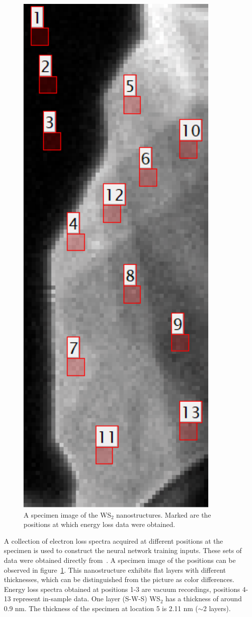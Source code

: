 \begin{figure}[h]
\begin{centering}
\includegraphics[width=0.2\linewidth]{plots/spectrumpositions.pdf} 
\caption{A specimen image of the WS$_2$ nanostructures. 
Marked are the positions at which energy loss data were obtained.}
\label{fig:ws2positions}
\end{centering}
\end{figure}
%
A collection of electron loss spectra acquired at different positions 
at the specimen is used to construct the neural network training inputs. 
%
These sets of data were obtained directly from~\cite{SabryaWS2}.
%
A specimen image of the positions can be observed in figure~\ref{fig:ws2positions}.  
This nanostructure exhibits flat layers with different thicknesses, which 
can be distinguished from the picture as color differences.
%
Energy loss spectra obtained at positions 1-3 are vacuum recordings, 
positions 4-13 represent in-sample data.
%
One layer (S-W-S) WS$_2$ has a thickness of around 0.9 nm. 
The thickness of the specimen at location 5 is 2.11 nm ($\sim$2 layers).
%
